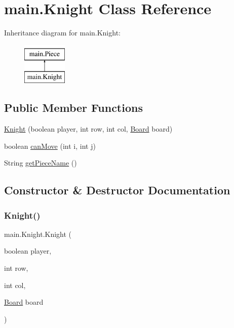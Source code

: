 \hypertarget{classmain_1_1_knight}{}\section{main.\+Knight Class Reference}
\label{classmain_1_1_knight}
Inheritance diagram for main.\+Knight\+:\begin{figure}[H]
\begin{center}
\leavevmode
\includegraphics[height=2.000000cm]{classmain_1_1_knight}
\end{center}
\end{figure}
\subsection*{Public Member Functions}
\begin{DoxyCompactItemize}
\item 
\mbox{\hyperlink{classmain_1_1_knight_a7a57ae558311d6cfd8e5ee9417453b8a}{Knight}} (boolean player, int row, int col, \mbox{\hyperlink{classmain_1_1_board}{Board}} board)
\item 
boolean \mbox{\hyperlink{classmain_1_1_knight_ae58baadc349750959356f3c235766fcf}{can\+Move}} (int i, int j)
\item 
String \mbox{\hyperlink{classmain_1_1_knight_a78dcdc3357df740c435e8c1b6c66d28f}{get\+Piece\+Name}} ()
\end{DoxyCompactItemize}


\subsection{Constructor \& Destructor Documentation}
\mbox{\label{classmain_1_1_knight_a7a57ae558311d6cfd8e5ee9417453b8a}} 
\subsubsection{\texorpdfstring{Knight()}{Knight()}}
{\footnotesize\ttfamily main.\+Knight.\+Knight (\begin{DoxyParamCaption}\item[{boolean}]{player,  }\item[{int}]{row,  }\item[{int}]{col,  }\item[{\mbox{\hyperlink{classmain_1_1_board}{Board}}}]{board }\end{DoxyParamCaption})\hspace{0.3cm}{\ttfamily [inline]}}

